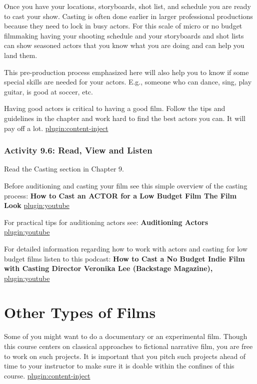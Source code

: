 \documentclass[
]{book}
\begin{document}
Once you have your locations, storyboards, shot list, and schedule you are ready to cast your show. Casting is often done earlier in larger professional productions because they need to lock in busy actors. For this scale of micro or no budget filmmaking having your shooting schedule and your storyboards and shot lists can show seasoned actors that you know what you are doing and can help you land them.

This pre-production process emphasized here will also help you to know if some special skills are needed for your actors. E.g., someone who can dance, sing, play guitar, is good at soccer, etc.

Having good actors is critical to having a good film. Follow the tips and guidelines in the chapter and work hard to find the best actors you can. It will pay off a lot.
\href{../_9-6}{plugin:content-inject}

\hypertarget{activity-9.6-read-view-and-listen}{%
\subsubsection*{Activity 9.6: Read, View and Listen}\label{activity-9.6-read-view-and-listen}}

Read the Casting section in Chapter 9.

Before auditioning and casting your film see this simple overview of the casting process: \textbf{How to Cast an ACTOR for a Low Budget Film \textbar{} The Film Look}
\href{https://www.youtube.com/watch?v=YpCkRPqsiJ4}{plugin:youtube}

For practical tips for auditioning actors see: \textbf{Auditioning Actors}
\href{https://www.youtube.com/watch?v=x0G6n346m90}{plugin:youtube}

For detailed information regarding how to work with actors and casting for low budget films listen to this podcast: \textbf{How to Cast a No Budget Indie Film with Casting Director Veronika Lee (Backstage Magazine),}
\href{https://www.youtube.com/watch?v=-DwKilT0T34}{plugin:youtube}

\hypertarget{other-types-of-films}{%
\section*{Other Types of Films}\label{other-types-of-films}}

Some of you might want to do a documentary or an experimental film. Though this course centers on classical approaches to fictional narrative film, you are free to work on such projects. It is important that you pitch such projects ahead of time to your instructor to make sure it is doable within the confines of this course.
\href{../_9-8}{plugin:content-inject}
\end{document}
